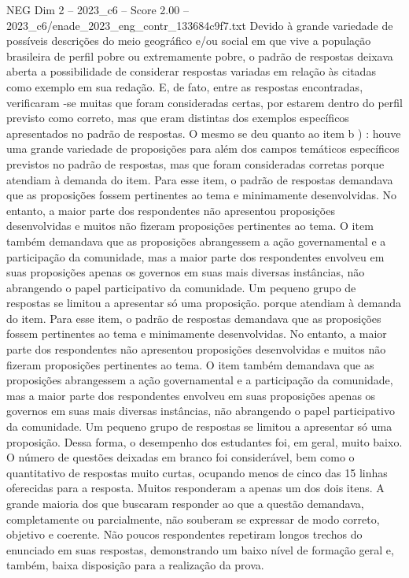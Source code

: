 \begin{textsample}{NEG Dim 2 – 2023\_c6 – Score 2.00 – 2023\_c6/enade\_2023\_eng\_contr\_133684c9f7.txt}
Devido à grande variedade de possíveis descrições do meio geográfico e/ou social em que vive a população brasileira de perfil pobre ou extremamente pobre, o padrão de respostas deixava aberta a possibilidade de considerar respostas variadas em relação às citadas como exemplo em sua redação.
E, de fato, entre as respostas encontradas, verificaram -se muitas que foram consideradas certas, por estarem dentro do perfil previsto como correto, mas que eram distintas dos exemplos específicos apresentados no padrão de respostas.
O mesmo se deu quanto ao item b ) : houve uma grande variedade de proposições para além dos campos temáticos específicos previstos no padrão de respostas, mas que foram consideradas corretas porque atendiam à demanda do item.
Para esse item, o padrão de respostas demandava que as proposições fossem pertinentes ao tema e minimamente desenvolvidas.
No entanto, a maior parte dos respondentes não apresentou proposições desenvolvidas e muitos não fizeram proposições pertinentes ao tema.
O item também demandava que as proposições abrangessem a ação governamental e a participação da comunidade, mas a maior parte dos respondentes envolveu em suas proposições apenas os governos em suas mais diversas instâncias, não abrangendo o papel participativo da comunidade.
Um pequeno grupo de respostas se limitou a apresentar só uma proposição. porque atendiam à demanda do item.
Para esse item, o padrão de respostas demandava que as proposições fossem pertinentes ao tema e minimamente desenvolvidas.
No entanto, a maior parte dos respondentes não apresentou proposições desenvolvidas e muitos não fizeram proposições pertinentes ao tema.
O item também demandava que as proposições abrangessem a ação governamental e a participação da comunidade, mas a maior parte dos respondentes envolveu em suas proposições apenas os governos em suas mais diversas instâncias, não abrangendo o papel participativo da comunidade.
Um pequeno grupo de respostas se limitou a apresentar só uma proposição.
Dessa forma, o desempenho dos estudantes foi, em geral, muito baixo.
O número de questões deixadas em branco foi considerável, bem como o quantitativo de respostas muito curtas, ocupando menos de cinco das 15 linhas oferecidas para a resposta.
Muitos responderam a apenas um dos dois itens.
A grande maioria dos que buscaram responder ao que a questão demandava, completamente ou parcialmente, não souberam se expressar de modo correto, objetivo e coerente.
Não poucos respondentes repetiram longos trechos do enunciado em suas respostas, demonstrando um baixo nível de formação geral e, também, baixa disposição para a realização da prova.

\end{textsample}
